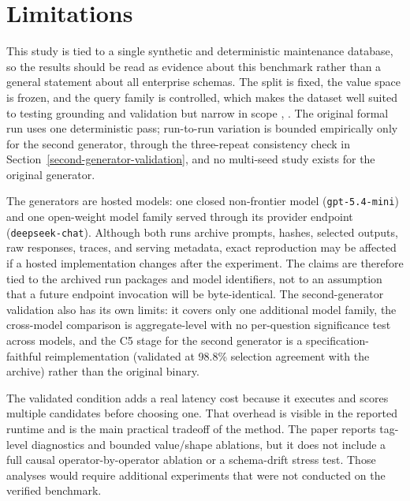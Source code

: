 \documentclass{ieeeaccess}
\begin{document}
\section{Limitations}\label{limitations}

This study is tied to a single synthetic and deterministic maintenance database, so the results should be read as evidence about this benchmark rather than a general statement about all enterprise schemas. The split is fixed, the value space is frozen, and the query family is controlled, which makes the dataset well suited to testing grounding and validation but narrow in scope \cite{zhong2020semantic}, \cite{lei2024spider}. The original formal run uses one deterministic pass; run-to-run variation is bounded empirically only for the second generator, through the three-repeat consistency check in Section~\ref{second-generator-validation}, and no multi-seed study exists for the original generator.

The generators are hosted models: one closed non-frontier model (\texttt{gpt-5.4-mini}) and one open-weight model family served through its provider endpoint (\texttt{deepseek-chat}). Although both runs archive prompts, hashes, selected outputs, raw responses, traces, and serving metadata, exact reproduction may be affected if a hosted implementation changes after the experiment. The claims are therefore tied to the archived run packages and model identifiers, not to an assumption that a future endpoint invocation will be byte-identical. The second-generator validation also has its own limits: it covers only one additional model family, the cross-model comparison is aggregate-level with no per-question significance test across models, and the C5 stage for the second generator is a specification-faithful reimplementation (validated at 98.8\% selection agreement with the archive) rather than the original binary.

The validated condition adds a real latency cost because it executes and scores multiple candidates before choosing one. That overhead is visible in the reported runtime and is the main practical tradeoff of the method. The paper reports tag-level diagnostics and bounded value/shape ablations, but it does not include a full causal operator-by-operator ablation or a schema-drift stress test. Those analyses would require additional experiments that were not conducted on the verified benchmark.
\end{document}
